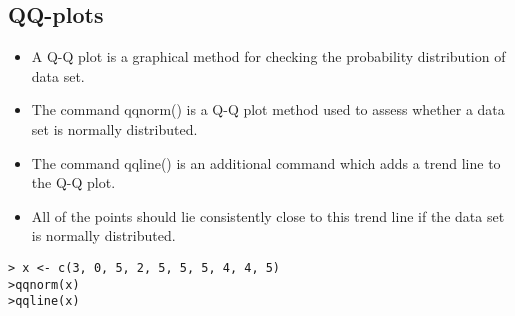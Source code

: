 \documentclass[ModuleBmain.tex]{subfiles}
\begin{document}
\subsection{QQ-plots}

\begin{itemize}
\item A Q-Q plot is a graphical method for checking the
probability distribution of data set. \item The command qqnorm()
is a Q-Q plot method used to assess whether a data set is normally distributed.
\item The command qqline() is an additional command which adds a
trend line to the Q-Q plot. \item All of the points should lie
consistently close to this trend line if the data set is normally
distributed.
\end{itemize}
\begin{verbatim}
> x <- c(3, 0, 5, 2, 5, 5, 5, 4, 4, 5)
>qqnorm(x)
>qqline(x)
\end{verbatim}

\end{document}
